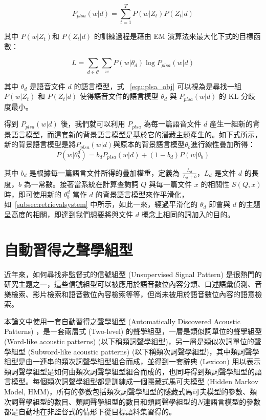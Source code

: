 \begin{equation}
P_{plsa}(w|d) = \sum_{t=1}^T P(w|Z_t)P(Z_t|d)
\end{equation}

其中 $P(w|Z_t)$和 $P(Z_t|d)$ 的訓練過程是藉由 EM 演算法來最大化下式的目標函數：

\begin{equation}
\label{equ:plsa_obj}
L=\sum_{d \in \mathcal{C}} \sum_w P(w|\theta_d) \log P_{plsa}(w|d)
\end{equation}

其中 $\theta_d$ 是語音文件 $d$ 的語言模型，式 ~\ref{equ:plsa_obj} 可以視為是尋找一組 $P(w|Z_t)$ 和 $P(Z_t|d)$ 使得語音文件的語言模型 $\theta_d$ 與 $P_{plsa}(w|d)$ 的 KL 分歧度最小。 

得到 $P_{plsa}(w|d)$ 後，我們就可以利用 $P_{plsa}$ 為每一篇語音文件 $d$ 產生一組新的背景語言模型，而這套新的背景語言模型是基於它的潛藏主題產生的。如下式所示，新的背景語言模型是將$P_{plsa}(w|d)$與原本的背景語言模型$\theta_b$進行線性疊加所得：
\begin{equation}
P(w|\theta_b^d) = b_dP_{plsa}(w|d) + (1-b_d)P(w|\theta_b)
\end{equation}

其中 $b_d$ 是根據每一篇語言文件所得的疊加權重，定義為 $\frac{L_d}{L_d+b}$，$L_d$ 是文件 $d$ 的長度，$b$ 為一常數。接著當系統在計算查詢詞 $Q$ 與每一篇文件 $x$ 的相關性 $S(Q, x)$ 時，即可使用新的 $\theta_b^d$ 當作 $d$ 的背景語言模型來作平滑化，如~\ref{subsec:retrievalsystem} 中所示，如此一來，經過平滑化的 $\theta_d$ 即會與 $d$ 的主題呈高度的相關，即達到我們想要將與文件 $d$ 概念上相同的詞加入的目的。

\section{自動習得之聲學組型}
\label{sec:chap2_ap}
近年來，如何尋找非監督式的信號組型 (Unsupervised Signal Pattern) 是很熱門的研究主題之一，這些信號組型可以被應用於語音數位內容分類、口述語彙偵測、音樂檢索、影片檢索和語音數位內容檢索等等，但尚未被用於語音數位內容的語意檢索。

本論文中使用一套自動習得之聲學組型 (Automatically Discovered Acoustic Patterns) ，是一套兩層式 (Two-level) 的聲學組型，一層是類似詞單位的聲學組型 (Word-like acoustic patterns) (以下稱類詞聲學組型)，另一層是類似次詞單位的聲學組型 (Subword-like acoustic patterns) (以下稱類次詞聲學組型)，其中類詞聲學組型是由一連串的類次詞聲學組型組合而成，並得到一套辭典 (Lexicon) 用以表示類詞聲學組型是如何由類次詞聲學組型組合而成的，也同時得到類詞聲學組型的語言模型。每個類次詞聲學組型都是訓練成一個隱藏式馬可夫模型 (Hidden Markov Model, HMM)，所有的參數包括類次詞聲學組型的隱藏式馬可夫模型的參數、類次詞聲學組型的數目、類詞聲學組型的數目和類詞聲學組型的$N$連語言模型的參數都是自動地在非監督式的情形下從目標語料集習得的。

